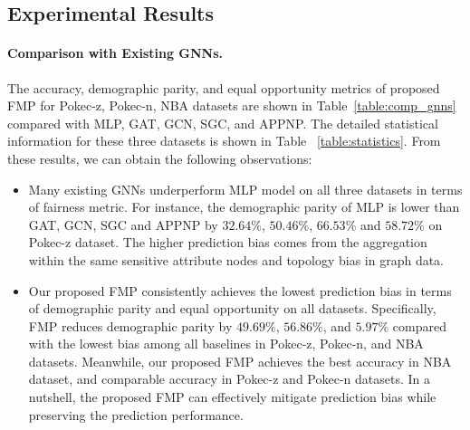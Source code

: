 \documentclass[letterpaper]{article} %
\theoremstyle{plain}
\theoremstyle{definition}
\theoremstyle{remark}
\begin{document}
\subsection{Experimental Results}
\paragraph{Comparison with Existing GNNs.} The accuracy, demographic parity, and equal opportunity metrics of proposed FMP for Pokec-z, Pokec-n, NBA datasets are shown in Table~\ref{table:comp_gnns} compared with MLP, GAT, GCN, SGC, and APPNP. The detailed statistical information for these three datasets is shown in Table ~\ref{table:statistics}. From these results, we can obtain the following observations:
\begin{itemize}[leftmargin=0.2cm, itemindent=.0cm, itemsep=0.0cm, topsep=0.0cm]
    \item Many existing GNNs underperform MLP model on all three datasets in terms of fairness metric. For instance, the demographic parity of MLP is lower than GAT, GCN, SGC and APPNP by $32.64\%$, $50.46\%$, $66.53\%$ and $58.72\%$ on Pokec-z dataset. The higher prediction bias comes from the aggregation within the same sensitive attribute nodes and topology bias in graph data.
    \item Our proposed FMP consistently achieves the lowest prediction bias in terms of demographic parity and equal opportunity on all datasets. Specifically, FMP reduces demographic parity by $49.69\%$, $56.86\%$, and $5.97\%$ compared with the lowest bias among all baselines in Pokec-z, Pokec-n, and NBA datasets. Meanwhile, our proposed FMP achieves the best accuracy in NBA dataset, and comparable accuracy in Pokec-z and Pokec-n datasets. In a nutshell, the proposed FMP can effectively mitigate prediction bias while preserving the prediction performance.
\end{itemize}
\end{document}
